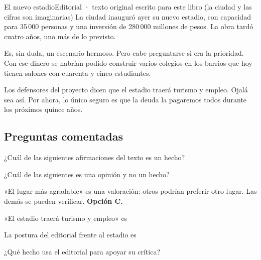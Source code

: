 \begin{texto}{El nuevo estadio}{Editorial · texto original escrito para este libro (la ciudad y las cifras son imaginarias)}
\pa La ciudad inauguró ayer su nuevo estadio, con capacidad para 35\,000 personas y una inversión de 280\,000 millones de
pesos. La obra tardó cuatro años, uno más de lo previsto.

\pa Es, sin duda, un escenario hermoso. Pero cabe preguntarse si era la prioridad. Con ese dinero se habrían podido
construir varios colegios en los barrios que hoy tienen salones con cuarenta y cinco estudiantes.

\pa Los defensores del proyecto dicen que el estadio traerá turismo y empleo. Ojalá sea así. Por ahora, lo único seguro es
que la deuda la pagaremos todos durante los próximos quince años.
\end{texto}

\subsection{Preguntas comentadas}
\begin{comentada}{¿Cuál de las siguientes afirmaciones del texto es un hecho?}
\end{comentada}

\begin{reto}
¿Cuál de las siguientes es una opinión y no un hecho?
\end{reto}

\begin{retoresuelto}
«El lugar más agradable» es una valoración: otros podrían preferir otro lugar. Las demás se pueden verificar.
\textbf{Opción C.}
\end{retoresuelto}

\taller
{}
\begin{ejercicios}
\item «El estadio traerá turismo y empleo»  es
\item La postura del editorial frente al estadio es
\item ¿Qué hecho usa el editorial para apoyar su crítica?
\end{ejercicios}

